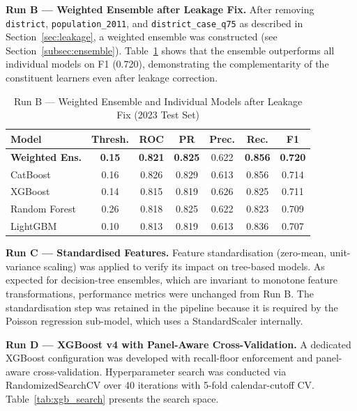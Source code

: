 \documentclass[conference]{IEEEtran}
\begin{document}
\textbf{Run B --- Weighted Ensemble after Leakage Fix.}
After removing \texttt{district}, \texttt{population\_2011}, and
\texttt{district\_case\_q75} as described in Section~\ref{sec:leakage},
a weighted ensemble was constructed (see Section~\ref{subsec:ensemble}).
Table~\ref{tab:run_b} shows that the ensemble outperforms all
individual models on F1 (0.720), demonstrating the complementarity
of the constituent learners even after leakage correction.

\begin{table}[htbp]
  \caption{Run B --- Weighted Ensemble and Individual Models
           after Leakage Fix (2023 Test Set)}
  \label{tab:run_b}
  \centering
  \renewcommand{\arraystretch}{1.15}
  \setlength{\tabcolsep}{3pt}
  \begin{tabular}{lcccccc}
    \toprule
    \textbf{Model} & \textbf{Thresh.} & \textbf{ROC} &
    \textbf{PR} & \textbf{Prec.} & \textbf{Rec.} & \textbf{F1} \\
    \midrule
    \textbf{Weighted Ens.} & \textbf{0.15} & \textbf{0.821} &
    \textbf{0.825} & 0.622 & \textbf{0.856} & \textbf{0.720} \\
    CatBoost       & 0.16 & 0.826 & 0.829 & 0.613 & 0.856 & 0.714 \\
    XGBoost        & 0.14 & 0.815 & 0.819 & 0.626 & 0.825 & 0.711 \\
    Random Forest  & 0.26 & 0.818 & 0.825 & 0.622 & 0.823 & 0.709 \\
    LightGBM       & 0.10 & 0.813 & 0.819 & 0.613 & 0.836 & 0.707 \\
    \bottomrule
  \end{tabular}
\end{table}

\textbf{Run C --- Standardised Features.}
Feature standardisation (zero-mean, unit-variance scaling) was
applied to verify its impact on tree-based models. As expected for
decision-tree ensembles, which are invariant to monotone feature
transformations, performance metrics were unchanged from Run B. The
standardisation step was retained in the pipeline because it is
required by the Poisson regression sub-model, which uses a
StandardScaler internally.

\textbf{Run D --- XGBoost v4 with Panel-Aware Cross-Validation.}
A dedicated XGBoost configuration was developed with recall-floor
enforcement and panel-aware cross-validation. Hyperparameter search
was conducted via RandomizedSearchCV over 40 iterations with 5-fold
calendar-cutoff CV. Table~\ref{tab:xgb_search} presents the search
space.
\end{document}

